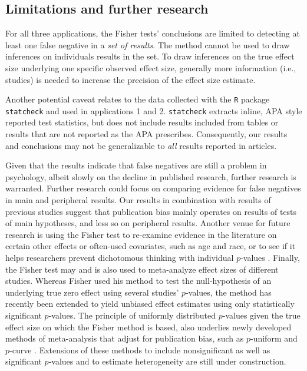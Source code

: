 \documentclass{article}
\begin{document}
\subsection*{Limitations and further research}

For all three applications, the Fisher tests' conclusions are limited to detecting at least one false negative in a \textit{set of results}. The method cannot be used to draw inferences on individuals results in the set. To draw inferences on the true effect size underlying one specific observed effect size, generally more information (i.e., studies) is needed to increase the precision of the effect size estimate.

Another potential caveat relates to the data collected with the \texttt{R} package \texttt{statcheck} and used in applications 1 and 2. \texttt{statcheck} extracts inline, APA style reported test statistics, but does not include results included from tables or results that are not reported as the APA prescribes. Consequently, our results and conclusions may not be generalizable to \textit{all} results reported in articles. 

Given that the results indicate that false negatives are still a problem in psychology, albeit slowly on the decline in published research, further research is warranted. Further research could focus on comparing evidence for false negatives in main and peripheral results. Our results in combination with results of previous studies suggest that publication bias mainly operates on results of tests of main hypotheses, and less so on peripheral results. Another venue for future research is using the Fisher test to re-examine evidence in the literature on certain other effects or often-used covariates, such as age and race, or to see if it helps researchers prevent dichotomous thinking with individual $p$-values \cite{Hoekstra2006}. Finally, the Fisher test may and is also used to meta-analyze effect sizes of different studies. Whereas Fisher used his method to test the null-hypothesis of an underlying true zero effect using several studies’ $p$-values, the method has recently been extended to yield unbiased effect estimates using only statistically significant $p$-values. The principle of uniformly distributed $p$-values given the true effect size on which the Fisher method is based, also underlies newly developed methods of meta-analysis that adjust for publication bias, such as $p$-uniform \cite{Van_Assen2015-gg} and $p$-curve \cite{Simonsohn2014-dm}. Extensions of these methods to include nonsignificant as well as significant $p$-values and to estimate heterogeneity are still under construction.
\end{document}

